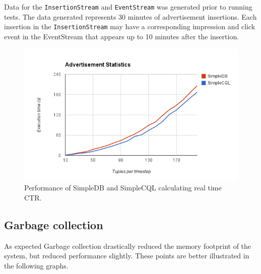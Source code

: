 \documentclass[a4paper, 10pt, conference]{IEEEconf}
\begin{document}
Data for the \texttt{InsertionStream} and \texttt{EventStream} was generated prior to running tests.  The data generated represents 30 minutes of advertisement insertions.  Each insertion in the \texttt{InsertionStream} may have a corresponding impression and click event in the EventStream that appears up to 10 minutes after the insertion.

\begin{figure}[tpH!]
    \centering
    \centerline{\includegraphics[totalheight=5cm]{ads.png}}
    \caption{Performance of SimpleDB and SimpleCQL calculating real time CTR.}
    \label{fig:attack}
\end{figure}

\subsection{Garbage collection}
As expected Garbage collection drastically reduced the memory footprint of the system, but reduced performance slightly. These points are better illustrated in the following graphs.




\end{document}
